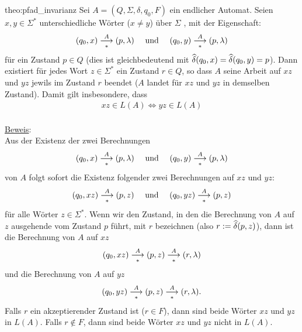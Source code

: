 \begin{theo}{theo:pfad_invarianz}
	Sei $A = (Q,\Sigma,\delta,q_0,F)$ ein endlicher Automat. Seien $x,y\in\Sigma^*$ unterschiedliche Wörter ($x\neq y$) über $\Sigma$ , mit der Eigenschaft:
	\begin{align*}
		(q_0,x)\underset{*}{\overset{A}{\longrightarrow}} (p,\lambda) \quad \text{ und } \quad (q_0,y)\underset{*}{\overset{A}{\longrightarrow}} (p,\lambda)
	\end{align*}
	für ein Zustand $p\in Q$ (dies ist gleichbedeutend mit $\widehat{\delta}(q_0,x) = \widehat{\delta}(q_0,y) = p$). Dann existiert für jedes Wort $z\in\Sigma^*$ ein Zustand $r\in Q$, so dass $A$ seine Arbeit auf $xz$ und $yz$ jewils im Zustand $r$ beendet ($A$ landet für $xz$ und $yz$ in demselben Zustand). Damit gilt insbesondere, dass
	\begin{align*}
		xz \in L(A) \Longleftrightarrow yz \in L(A)
	\end{align*}
	\\

	\noindent
	\underline{Beweis}:\\
	Aus der Existenz der zwei Berechnungen
	\begin{align*}
		(q_0,x)\underset{*}{\overset{A}{\longrightarrow}} (p,\lambda) \quad \text{ und } \quad (q_0,y)\underset{*}{\overset{A}{\longrightarrow}} (p,\lambda)
	\end{align*}
	von $A$ folgt sofort die Existenz folgender zwei Berechnungen auf $xz$ und $yz$:
	\begin{align*}
		(q_0,xz)\underset{*}{\overset{A}{\longrightarrow}} (p,z) \quad \text{ und } \quad (q_0,yz)\underset{*}{\overset{A}{\longrightarrow}} (p,z)
	\end{align*}
	für alle Wörter $z\in\Sigma^*$. Wenn wir den Zustand, in den die Berechnung von $A$ auf $z$ ausgehende vom Zustand $p$ führt, mit $r$ bezeichnen (also $r:= \widehat{\delta}(p,z)$), dann ist die Berechnung von $A$ auf $xz$
	\begin{align*}
		(q_0,xz)\underset{*}{\overset{A}{\longrightarrow}} (p,z)\underset{*}{\overset{A}{\longrightarrow}} (r,\lambda)
	\end{align*}
	und die Berechnung von $A$ auf $yz$
	\begin{align*}
		(q_0,yz)\underset{*}{\overset{A}{\longrightarrow}} (p,z)\underset{*}{\overset{A}{\longrightarrow}} (r,\lambda).
	\end{align*}
	Falls $r$ ein akzeptierender Zustand ist ($r\in F$), dann sind beide Wörter $xz$ und $yz$ in $L(A)$. Falls $r\notin F$, dann sind beide Wörter $xz$ und $yz$ nicht in $L(A)$.
\end{theo}

